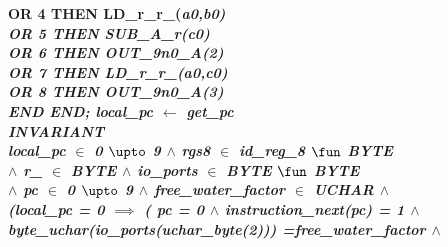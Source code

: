 {\begin{sloppypar}
\hspace*{1.00in}\bf OR \rm 4 \bf THEN \hspace*{0.47in}\bf LD\_r\_r\_\rm (\it a0\rm ,\it b0\rm )\\
\hspace*{1.00in}\bf OR \rm 5 \bf THEN \hspace*{0.47in}\bf SUB\_A\_r\rm (\it c0\rm )\\
\hspace*{1.00in}\bf OR \rm 6 \bf THEN \hspace*{0.47in}\bf OUT\_9n0\_A\rm (\rm 2\rm )\\ 
\hspace*{1.00in}\bf OR \rm 7 \bf THEN \hspace*{0.47in}\bf LD\_r\_r\_\rm (\it a0\rm ,\it c0\rm )\\
\hspace*{1.00in}\bf OR \rm 8 \bf THEN \hspace*{0.47in}\bf OUT\_9n0\_A\rm (\rm 3\rm )\\ 
\hspace*{1.00in}\bf END
\hspace*{0.20in}\bf END\rm ;
\hspace*{0.20in}\it local\_pc  $\leftarrow$  \bf get\_pc\\
\hspace*{0.70in}\bf INVARIANT\\
\hspace*{0.80in}\it local\_pc  $\in$  \rm 0 $\upto$ \rm 9  $\land$  \it rgs8  $\in$  \it id\_reg\_8 
$\fun$  \it BYTE\\
\hspace*{0.80in} $\land$  \it r\_\hspace*{0.10in} $\in$  \it BYTE  $\land$  \it io\_ports  $\in$  \it
BYTE  $\fun$  \it BYTE\\
\hspace*{0.80in} $\land$  \it pc  $\in$  \rm 0 $\upto$ \rm 9  $\land$  \it free\_water\_factor  $\in$ 
\it UCHAR  $\land$\\
\hspace*{0.80in}\rm (\it local\_pc \rm = \rm 0  $\implies$  \rm ( \it pc \rm = \rm 0  $\land$  \it
instruction\_next\rm (\it pc\rm ) \rm = \rm 1  $\land$\\
\hspace*{1.10in}\it byte\_uchar\rm (\it io\_ports\rm (\it uchar\_byte\rm (\rm 2\rm )\rm )\rm ) \rm
=\hspace*{0.10in}\it free\_water\_factor  $\land$\\

\end{sloppypar}}
